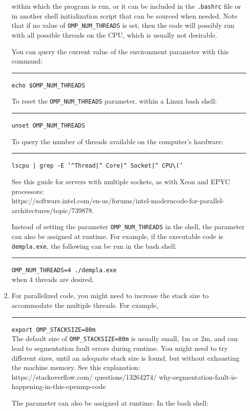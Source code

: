 \documentclass[letterpaper,11pt]{article}
\begin{document}
\begin{enumerate}
within which the program is run,
or it can be included in the \texttt{.bashrc} file or in
another shell initialization script that can be sourced when needed.
Note that if no value of \texttt{OMP\_NUM\_THREADS} is set, then the
code will possibly run with all possible threads on the CPU,
which is usually not desirable.
\par
You can query the current value
of the environment parameter with this command:\\
    \rule{3ex}{0ex}\texttt{echo \$OMP\_NUM\_THREADS}
\par
To reset the \texttt{OMP\_NUM\_THREADS} parameter,
within a Linux bash shell:\\
\rule{3ex}{0ex}\texttt{unset OMP\_NUM\_THREADS}
\par
To query the number of threads available on the computer's hardware:\\
 \rule{3ex}{0ex}\texttt{lscpu | grep -E '\textasciicircum Thread|\textasciicircum
 Core|\textasciicircum
 Socket|\textasciicircum
 CPU\textbackslash('}
\par
See this guide for servers with multiple sockets, as with
Xeon and EPYC processors:\\
 https://software.intel.com/en-us/forums/intel-moderncode-for-parallel-architectures/topic/739878.
\par
Instead of setting the parameter
\texttt{OMP\_NUM\_THREADS}
in the shell, the
parameter can also be assigned at runtime.  For example,
if the executable code is 
\texttt{dempla.exe}, the following can
be run in the bash shell:\\
\rule{3ex}{0ex}\texttt{OMP\_NUM\_THREADS=4 ./dempla.exe}\\
when 4 threads are desired.
\item
For parallelized code, you might need to increase the stack
size to accommodate the multiple threads.  For example,\\
\rule{3ex}{0ex}\texttt{export OMP\_STACKSIZE=80m}\\
The default size of \texttt{OMP\_STACKSIZE=80m}
is usually small, 1m or 2m, and can lead
to segmentation fault errors during runtime.
You might need
to try different sizes, until an adequate stack size is found,
but without exhausting the machine memory.
See this explanation:\\
https://stackoverflow.com/
questions/13264274/
why-segmentation-fault-is-happening-in-this-openmp-code
\par
The parameter can also be assigned at runtime.
In the bash shell:\\

\end{enumerate}
\end{document}
